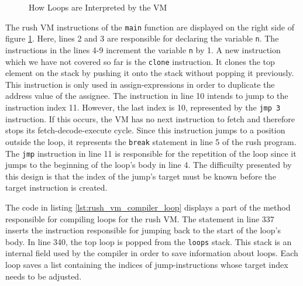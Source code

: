 \noindent
\begin{figure}[h]
	\begin{minipage}{.5\textwidth}
		\centering
	\end{minipage}%
	\begin{minipage}{.5\textwidth}
		\centering
	\end{minipage}
	\caption{How Loops are Interpreted by the VM}
	\label{fig:vm_loops}
\end{figure}

The rush VM instructions of the \texttt{main} function are displayed on the right side of figure \ref{fig:vm_loops}.
Here, lines 2 and 3 are responsible for declaring the variable \texttt{n}.
The instructions in the lines 4-9 increment the variable \texttt{n} by 1.
A new instruction which we have not covered so far is the \texttt{clone} instruction.
It clones the top element on the stack by pushing it onto the stack without popping it previously.
This instruction is only used in assign-expressions in order to duplicate the address value of the assignee.
The instruction in line 10 intends to jump to the instruction index 11.
However, the last index is 10, represented by the \texttt{jmp 3} instruction.
If this occurs, the VM has no next instruction to fetch and therefore stops its fetch-decode-execute cycle.
Since this instruction jumps to a position outside the loop, it represents the \texttt{break} statement in line 5 of the rush program.
The \texttt{jmp} instruction in line 11 is responsible for the repetition of the loop since it jumps to the beginning of the loop's body in line 4.
The difficuilty presented by this design is that the index of the jump's target must be known before the target instruction is created.


The code in listing \ref{lst:rush_vm_compiler_loop} displays a part of the method responsible for compiling loops for the rush VM.
The statement in line 337 inserts the instruction responsible for jumping back to the start of the loop's body.
In line 340, the top loop is popped from the \texttt{loops} stack.
This stack is an internal field used by the compiler in order to save information about loops.
Each loop saves a list containing the indices of jump-instructions whose target index needs to be adjusted.


